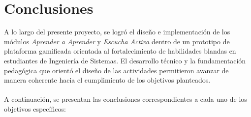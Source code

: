 \section{Conclusiones}

A lo largo del presente proyecto, se logró el diseño e implementación de los módulos \textit{Aprender a Aprender} y \textit{Escucha Activa} dentro de un prototipo de plataforma gamificada orientada al fortalecimiento de habilidades blandas en estudiantes de Ingeniería de Sistemas. El desarrollo técnico y la fundamentación pedagógica que orientó el diseño de las actividades permitieron avanzar de manera coherente hacia el cumplimiento de los objetivos planteados.
\\ \\
A continuación, se presentan las conclusiones correspondientes a cada uno de los objetivos específicos:

